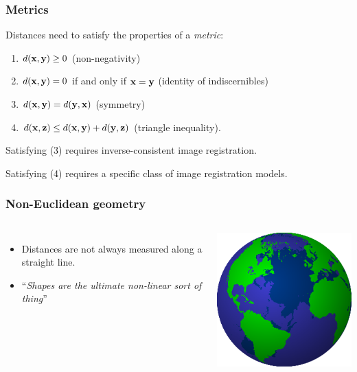 \begin{frame}
\frametitle{Metrics}
Distances need to satisfy the properties of a \emph{metric}:
\begin{enumerate}
\item $d({\bf x}, {\bf y}) \ge 0$ (non-negativity)
\item $d({\bf x}, {\bf y}) = 0$ if and only if ${\bf x} = {\bf y}$ (identity of indiscernibles)
\item $d({\bf x}, {\bf y}) = d({\bf y}, {\bf x})$ (symmetry)
\item $d({\bf x}, {\bf z}) \le d({\bf x}, {\bf y}) + d({\bf y}, {\bf z})$ (triangle inequality).
\end{enumerate}

Satisfying (3) requires inverse-consistent image registration.

Satisfying (4) requires a specific class of image registration models.
\end{frame}


\begin{frame}
\frametitle{Non-Euclidean geometry}
\begin{columns}[c]
\begin{itemize}
\item Distances are not always measured along a straight line.
\item ``\emph{Shapes are the ultimate non-linear sort of thing}''
\end{itemize}
\includegraphics[width=\textwidth]{Globe}
\end{columns}
\end{frame}


